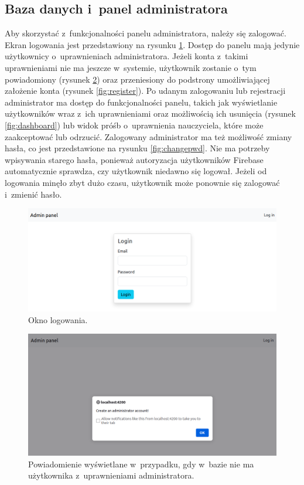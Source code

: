\documentclass[a4paper,twoside,12pt]{book}
\begin{document}
\subsection{Baza danych i~panel administratora}

Aby skorzystać z~funkcjonalności panelu administratora, należy się zalogować. Ekran logowania jest przedstawiony na rysunku \ref{fig:login}. Dostęp do panelu mają jedynie użytkownicy o~uprawnieniach administratora. Jeżeli konta z~takimi uprawnieniami nie ma jeszcze w~systemie, użytkownik zostanie o~tym powiadomiony (rysunek \ref{fig:alert}) oraz przeniesiony do podstrony umożliwiającej założenie konta (rysunek \ref{fig:register}). Po udanym zalogowaniu lub rejestracji administrator ma dostęp do funkcjonalności panelu, takich jak wyświetlanie użytkowników wraz z~ich uprawnieniami oraz możliwością ich usunięcia (rysunek \ref{fig:dashboard}) lub widok próśb o~uprawnienia nauczyciela, które może zaakceptować lub odrzucić. Zalogowany administrator ma też możliwość zmiany hasła, co jest przedstawione na rysunku \ref{fig:changepwd}. Nie ma potrzeby wpisywania starego hasła, ponieważ autoryzacja użytkowników Firebase automatycznie sprawdza, czy użytkownik niedawno się logował. Jeżeli od logowania minęło zbyt dużo czasu, użytkownik może ponownie się zalogować i~zmienić hasło. 

\begin{figure}[]
\centering
\includegraphics[width=\textwidth]{adminpanel/login}
\caption{Okno logowania.}
\label{fig:login}
\end{figure}

\begin{figure}[]
\centering
\includegraphics[width=\textwidth]{adminpanel/alert}
\caption{Powiadomienie wyświetlane w~przypadku, gdy w~bazie nie ma użytkownika z~uprawnieniami administratora.}
\label{fig:alert}
\end{figure}
\end{document}
